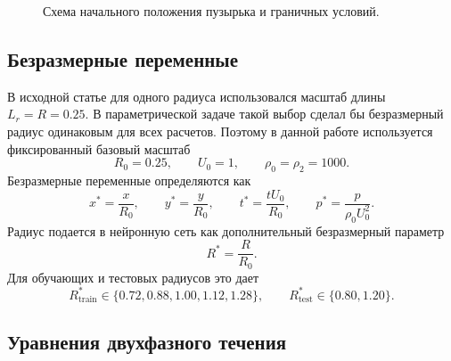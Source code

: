 \documentclass[12pt,a4paper]{article}
\newcommand{\Rbase}{R_0}
\newcommand{\Uref}{U_0}
\newcommand{\rhoref}{\rho_0}
\begin{document}
\begin{figure}[h]
    \centering
    \caption{Схема начального положения пузырька и граничных условий.}
    \label{fig:setup}
\end{figure}

\subsection{Безразмерные переменные}

В исходной статье для одного радиуса использовался масштаб длины \(L_r=R=0.25\).
В параметрической задаче такой выбор сделал бы безразмерный радиус одинаковым
для всех расчетов. Поэтому в данной работе используется фиксированный базовый
масштаб
\[
    \Rbase=0.25,\qquad \Uref=1,\qquad \rhoref=\rho_2=1000.
\]
Безразмерные переменные определяются как
\[
    x^*=\frac{x}{\Rbase},\qquad
    y^*=\frac{y}{\Rbase},\qquad
    t^*=\frac{t\Uref}{\Rbase},\qquad
    p^*=\frac{p}{\rhoref \Uref^2}.
\]
Радиус подается в нейронную сеть как дополнительный безразмерный параметр
\[
    R^*=\frac{R}{\Rbase}.
\]
Для обучающих и тестовых радиусов это дает
\[
    R^*_{\mathrm{train}}\in\{0.72,0.88,1.00,1.12,1.28\},
    \qquad
    R^*_{\mathrm{test}}\in\{0.80,1.20\}.
\]

\subsection{Уравнения двухфазного течения}
\end{document}
